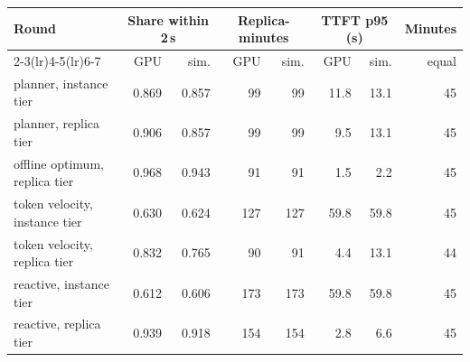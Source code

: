 \begin{tabular}{@{}lrrrrrrr@{}}
\toprule
Round & \multicolumn{2}{c}{Share within 2\,s} & \multicolumn{2}{c}{Replica-minutes} & \multicolumn{2}{c}{TTFT p95 (s)} & Minutes \\
\cmidrule(lr){2-3}\cmidrule(lr){4-5}\cmidrule(lr){6-7}
 & GPU & sim. & GPU & sim. & GPU & sim. & equal \\
\midrule
planner, instance tier & 0.869 & 0.857 & 99 & 99 & 11.8 & 13.1 & 45 \\
planner, replica tier & 0.906 & 0.857 & 99 & 99 & 9.5 & 13.1 & 45 \\
offline optimum, replica tier & 0.968 & 0.943 & 91 & 91 & 1.5 & 2.2 & 45 \\
token velocity, instance tier & 0.630 & 0.624 & 127 & 127 & 59.8 & 59.8 & 45 \\
token velocity, replica tier & 0.832 & 0.765 & 90 & 91 & 4.4 & 13.1 & 44 \\
reactive, instance tier & 0.612 & 0.606 & 173 & 173 & 59.8 & 59.8 & 45 \\
reactive, replica tier & 0.939 & 0.918 & 154 & 154 & 2.8 & 6.6 & 45 \\
\bottomrule
\end{tabular}
